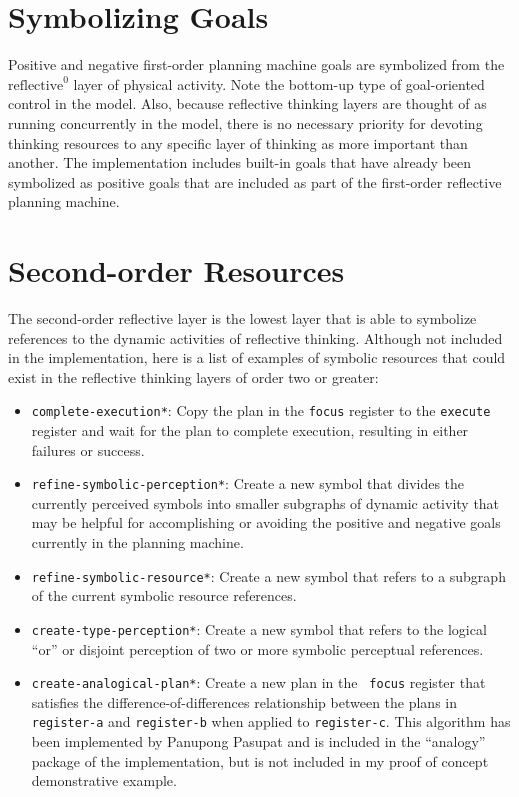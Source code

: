 \section{Symbolizing Goals}

Positive and negative first-order planning machine goals are
symbolized from the $\text{reflective}^0$ layer of physical activity.
Note the bottom-up type of goal-oriented control in the model.  Also,
because reflective thinking layers are thought of as running
concurrently in the model, there is no necessary priority for devoting
thinking resources to any specific layer of thinking as more important
than another.  The implementation includes built-in goals that have
already been symbolized as positive goals that are included as part of
the first-order reflective planning machine.

\section{Second-order Resources}

The second-order reflective layer is the lowest layer that is able to
symbolize references to the dynamic activities of reflective thinking.
Although not included in the implementation, here is a list of
examples of symbolic resources that could exist in the reflective
thinking layers of order two or greater:
\begin{itemize}
\item {\tt complete-execution*}: Copy the plan in the {\tt focus}
  register to the {\tt execute} register and wait for the plan to
  complete execution, resulting in either failures or success.
\item {\tt refine-symbolic-perception*}: Create a new symbol that
  divides the currently perceived symbols into smaller subgraphs of
  dynamic activity that may be helpful for accomplishing or avoiding
  the positive and negative goals currently in the planning machine.
\item {\tt refine-symbolic-resource*}: Create a new symbol that refers
  to a subgraph of the current symbolic resource references.
\item {\tt create-type-perception*}: Create a new symbol that refers
  to the logical ``or'' or disjoint perception of two or more symbolic
  perceptual references.
\item {\tt create-analogical-plan*}: Create a new plan in the {\tt
  focus} register that satisfies the \cite{winston:1970}
  difference-of-differences relationship between the plans in {\tt
    register-a} and {\tt register-b} when applied to {\tt register-c}.
  This algorithm has been implemented by Panupong Pasupat and is
  included in the ``analogy'' package of the implementation, but is
  not included in my proof of concept demonstrative example.
\end{itemize}

